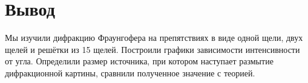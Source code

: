 \section{Вывод}

Мы изучили дифракцию Фраунгофера на препятствиях в виде одной щели, двух щелей и решётки из 15 щелей. Построили графики зависимости интенсивности от угла. Определили размер источника, при котором наступает размытие дифракционной картины, сравнили полученное значение с теорией.
